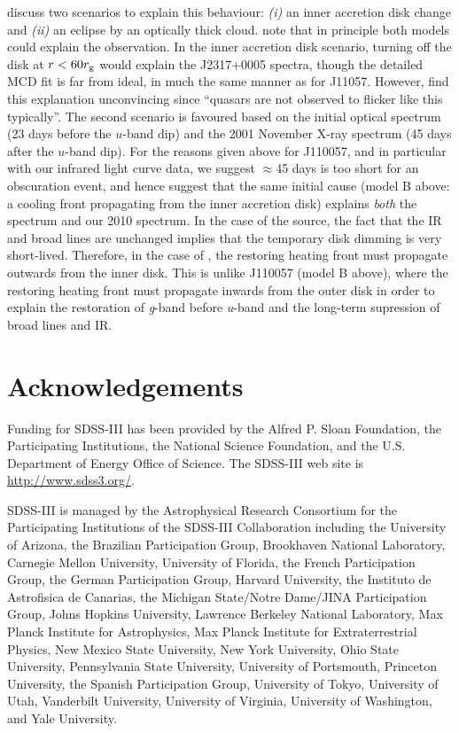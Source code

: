 \documentclass[11pt,a4paper]{article}
\begin{document}
\citet{Guo2016} discuss two scenarios to explain this behaviour: {\it
(i)} an inner accretion disk change and {\it (ii)} an eclipse by an
optically thick cloud. \citet{Guo2016} note that in principle both
models could explain the observation. In the inner accretion disk
scenario, turning off the disk at $r < 60 r_{\rm g}$ would explain the
J2317+0005 spectra, though the detailed MCD fit is far from ideal, in
much the same manner as for J11057. However, \citet{Guo2016} find this
explanation unconvincing since ``quasars are not observed to flicker
like this typically''.  The second scenario is favoured based on the
initial optical spectrum (23 days before the $u$-band dip) and the
2001 November X-ray spectrum (45 days after the $u$-band dip).  For
the reasons given above for J110057, and in particular with our
infrared light curve data, we suggest $\approx$45 days is too short
for an obscuration event, and hence suggest that the same initial
cause (model B above: a cooling front propagating from the inner
accretion disk) explains \emph{both} the \citet{Guo2016} spectrum and
our 2010 spectrum. In the case of the \citet{Guo2016} source, the fact
that the IR and broad lines are unchanged implies that the temporary
disk dimming is very short-lived. Therefore, in the case of
\citet{Guo2016}, the restoring heating front must propagate outwards
from the inner disk. This is unlike J110057 (model B above), where the
restoring heating front must propagate inwards from the outer disk in
order to explain the restoration of {\it g}-band before {\it u}-band
and the long-term supression of broad lines and IR.


\section*{Acknowledgements}
Funding for SDSS-III has been provided by the Alfred P. Sloan
Foundation, the Participating Institutions, the National Science
Foundation, and the U.S. Department of Energy Office of Science. The
SDSS-III web site is
\href{http://www.sdss3.org/}{http://www.sdss3.org/}.

SDSS-III is managed by the Astrophysical Research Consortium for the
Participating Institutions of the SDSS-III Collaboration including the
University of Arizona, the Brazilian Participation Group, Brookhaven
National Laboratory, Carnegie Mellon University, University of
Florida, the French Participation Group, the German Participation
Group, Harvard University, the Instituto de Astrofisica de Canarias,
the Michigan State/Notre Dame/JINA Participation Group, Johns Hopkins
University, Lawrence Berkeley National Laboratory, Max Planck
Institute for Astrophysics, Max Planck Institute for Extraterrestrial
Physics, New Mexico State University, New York University, Ohio State
University, Pennsylvania State University, University of Portsmouth,
Princeton University, the Spanish Participation Group, University of
Tokyo, University of Utah, Vanderbilt University, University of
Virginia, University of Washington, and Yale University.
\end{document}
